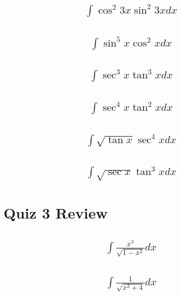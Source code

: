 \documentclass{article}
\begin{document}
\subsection{
	\begin{align*}
		\int{\cos^2{3x} \sin^2{3x}dx}
	\end{align*}
}
\subsection{
	\begin{align*}
		\int{\sin^5{x} \cos^2{x} dx}
	\end{align*}
}
\subsection{
	\begin{align*}
		\int{\sec^3{x} \tan^3{x} dx}
	\end{align*}
}
\subsection{
	\begin{align*}
		\int{\sec^4{x} \tan^2{x} dx}
	\end{align*}
}
\subsection{
	\begin{align*}
		\int{\sqrt{\tan{x}} \sec^4{x} dx}
	\end{align*}
}
\subsection{
	\begin{align*}
		\int{\sqrt{\sec{x}} \tan^3{x} dx}
	\end{align*}
}


\newpage
\section{Quiz 3 Review}
\subsection{
	\begin{align*}
		\int{\frac{x^3}{\sqrt{1 - x^2}} dx}
	\end{align*}
}

\subsection{
	\begin{align*}
		\int{\frac{1}{\sqrt{x^2 + 4}} dx}
	\end{align*}
}
\end{document}
